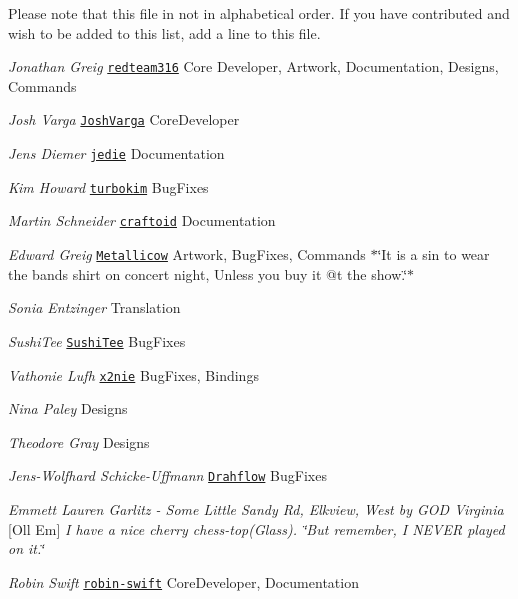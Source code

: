 Please note that this file in not in alphabetical order. If you have contributed and wish to be added to this list, add a line to this file.


\begin{DoxyItemize}
\item {\itshape Jonathan Greig} \href{https://github.com/redteam316}{\texttt{ {\ttfamily redteam316}}} Core Developer, Artwork, Documentation, Designs, Commands
\item {\itshape Josh Varga} \href{https://github.com/JoshVarga}{\texttt{ {\ttfamily Josh\+Varga}}} Core\+Developer
\item {\itshape Jens Diemer} \href{https://github.com/jedie}{\texttt{ {\ttfamily jedie}}} Documentation
\item {\itshape Kim Howard} \href{https://github.com/turbokim}{\texttt{ {\ttfamily turbokim}}} Bug\+Fixes
\item {\itshape Martin Schneider} \href{https://github.com/craftoid}{\texttt{ {\ttfamily craftoid}}} Documentation
\item {\itshape Edward Greig} \href{https://github.com/Metallicow}{\texttt{ {\ttfamily Metallicow}}} Artwork, Bug\+Fixes, Commands $\ast$\char`\"{}\+It is a sin to wear the band\textquotesingle{}s shirt on concert night, Unless you buy it @t the show.\char`\"{}$\ast$
\item {\itshape Sonia Entzinger} Translation
\item {\itshape Sushi\+Tee} \href{https://github.com/SushiTee}{\texttt{ {\ttfamily Sushi\+Tee}}} Bug\+Fixes
\item {\itshape Vathonie Lufh} \href{https://github.com/x2nie}{\texttt{ {\ttfamily x2nie}}} Bug\+Fixes, Bindings
\item {\itshape Nina Paley} Designs
\item {\itshape Theodore Gray} Designs
\item {\itshape Jens-\/\+Wolfhard Schicke-\/\+Uffmann} \href{https://github.com/}{\texttt{ {\ttfamily Drahflow}}} Bug\+Fixes
\item {\itshape Emmett Lauren Garlitz -\/ Some Little Sandy Rd, Elkview, West by GOD Virginia} \mbox{[}{\ttfamily Oll Em}\mbox{]} {\itshape I have a nice cherry chess-\/top(Glass). \char`\"{}\+But remember, I NEVER played on it.\char`\"{}}
\item {\itshape Robin Swift} \href{https://github.com/robin-swift}{\texttt{ {\ttfamily robin-\/swift}}} Core\+Developer, Documentation 
\end{DoxyItemize}